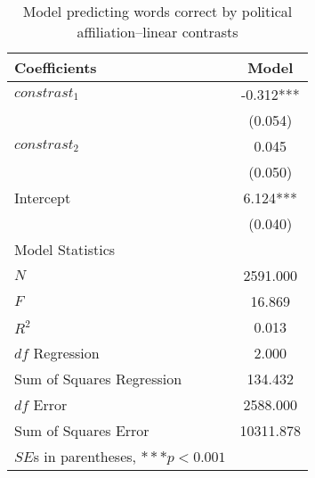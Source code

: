\begin{table}[htbp]\centering
 \caption{Model predicting words correct by political affiliation--linear contrasts
\label{tab:wordreg_contr}}
\begin{tabular}{lc}
\hline
Coefficients      &    Model  \\ \hline
$constrast_1$     &   -0.312***\\
      &   (0.054)  \\
$constrast_2$     &    0.045  \\
      &   (0.050)  \\
Intercept    &    6.124***\\
      &   (0.040)  \\
\hline
\multicolumn{1}{l}{Model Statistics} \\
\hline
$N$          &   2591.000  \\
$F$          &   16.869  \\
$R^2$        &    0.013  \\
$df$ Regression      &    2.000  \\
Sum of Squares Regression     &  134.432  \\
$df$ Error    &   2588.000  \\
Sum of Squares Error    &  10311.878  \\
\hline
\multicolumn{1}{l}{$SE$s in parentheses, $***p<0.001$} \\
\hline
\end{tabular}
\end{table}


